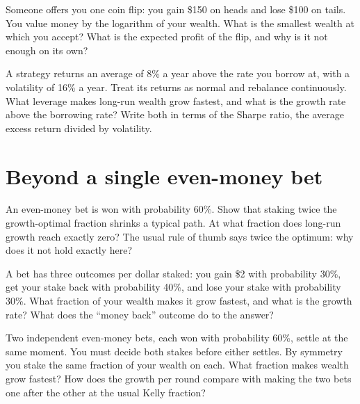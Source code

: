 \begin{question}\label{iq:iv2:betting-and-kelly:9}
Someone offers you one coin flip: you gain \$150 on heads and lose \$100 on tails. You value money by the logarithm of your wealth. What is the smallest wealth at which you accept? What is the expected profit of the flip, and why is it not enough on its own?
\end{question}

\begin{question}\label{iq:iv2:betting-and-kelly:10}
A strategy returns an average of 8\% a year above the rate you borrow at, with a volatility of 16\% a year. Treat its returns as normal and rebalance continuously. What leverage makes long-run wealth grow fastest, and what is the growth rate above the borrowing rate? Write both in terms of the Sharpe ratio, the average excess return divided by volatility.
\end{question}

\section{Beyond a single even-money bet}

\begin{question}\label{iq:iv2:betting-and-kelly:11}
An even-money bet is won with probability 60\%. Show that staking twice the growth-optimal fraction shrinks a typical path. At what fraction does long-run growth reach exactly zero? The usual rule of thumb says twice the optimum: why does it not hold exactly here?
\end{question}

\begin{question}\label{iq:iv2:betting-and-kelly:12}
A bet has three outcomes per dollar staked: you gain \$2 with probability 30\%, get your stake back with probability 40\%, and lose your stake with probability 30\%. What fraction of your wealth makes it grow fastest, and what is the growth rate? What does the ``money back'' outcome do to the answer?
\end{question}

\begin{question}\label{iq:iv2:betting-and-kelly:13}
Two independent even-money bets, each won with probability 60\%, settle at the same moment. You must decide both stakes before either settles. By symmetry you stake the same fraction of your wealth on each. What fraction makes wealth grow fastest? How does the growth per round compare with making the two bets one after the other at the usual Kelly fraction?
\end{question}

